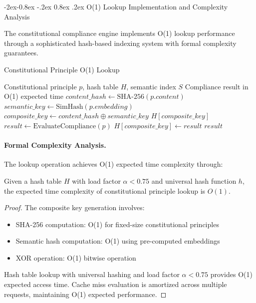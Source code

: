 \documentclass[manuscript,screen,9pt]{acmart}
\makeatletter
\renewcommand\subsubsection{\@startsection{subsubsection}{3}{\z@}%
  {-2ex\@plus -0.8ex \@minus -.2ex}%
  {0.8ex \@plus .2ex}%
  {\normalfont\normalsize\bfseries}}
\makeatother
\begin{document}
\subsubsection{O(1) Lookup Implementation and Complexity Analysis}

The constitutional compliance engine implements O(1) lookup performance through a sophisticated hash-based indexing system with formal complexity guarantees.

\begin{algorithm}[H]
\caption{Constitutional Principle O(1) Lookup}
\label{alg:constitutional_lookup}
\begin{algorithmic}[1]
\Require Constitutional principle $p$, hash table $H$, semantic index $S$
\Ensure Compliance result in O(1) expected time
\State $content\_hash \leftarrow \text{SHA-256}(p.content)$
\State $semantic\_key \leftarrow \text{SimHash}(p.embedding)$ 
\State $composite\_key \leftarrow content\_hash \oplus semantic\_key$
    \State \Return $H[composite\_key]$
\Else
    \State $result \leftarrow \text{EvaluateCompliance}(p)$
    \State $H[composite\_key] \leftarrow result$
    \State \Return $result$
\EndIf
\end{algorithmic}
\end{algorithm}

\paragraph{Formal Complexity Analysis.} The lookup operation achieves O(1) expected time complexity through:

\begin{theorem}
Given a hash table $H$ with load factor $\alpha < 0.75$ and universal hash function $h$, the expected time complexity of constitutional principle lookup is $O(1)$.
\end{theorem}

\begin{proof}
The composite key generation involves:
\begin{itemize}
    \item SHA-256 computation: O(1) for fixed-size constitutional principles
    \item Semantic hash computation: O(1) using pre-computed embeddings
    \item XOR operation: O(1) bitwise operation
\end{itemize}
Hash table lookup with universal hashing and load factor $\alpha < 0.75$ provides O(1) expected access time. Cache miss evaluation is amortized across multiple requests, maintaining O(1) expected performance.
\end{proof}
\end{document}
